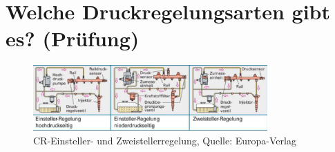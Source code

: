 \newpage

\section{Welche Druckregelungsarten gibt es?
(Prüfung)}\label{welche-druckregelungsarten-gibt-es-pruefung}

\begin{figure}[!ht]%
\centering
\includegraphics[width=0.8\textwidth]{images/Diesel/Diesel-2.pdf}
\caption{CR-Einsteller- und Zweistellerregelung, Quelle: Europa-Verlag}
\end{figure}

